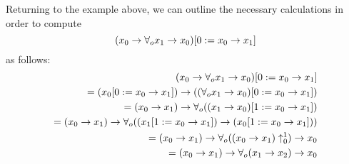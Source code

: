 Returning to the example above, we can outline the necessary calculations
in order to compute
$$\dbsub{0}{x_0\to x_1}{(x_0\to\forall_o x_1\to x_0)}$$
as follows:
\begin{eqnarray*}
\dbsub{0}{x_0\to x_1}{(x_0\to\forall_o x_1\to x_0)} \\
 = (\dbsub{0}{x_0\to x_1}{x_0})\to(\dbsub{0}{x_0\to x_1}{(\forall_o x_1\to x_0)}) \\
 = 
(x_0\to x_1)\to\forall_o (\dbsub{1}{x_0\to x_1}{(x_1\to x_0)}) \\
 = 
(x_0\to x_1)\to\forall_o ((\dbsub{1}{x_0\to x_1}{x_1}) \to (\dbsub{1}{x_0\to x_1}{x_0})) \\
 = 
(x_0\to x_1)\to\forall_o (\dbsh{0}{1}{(x_0\to x_1)}) \to x_0 \\
 = 
(x_0\to x_1)\to\forall_o (x_1\to x_2) \to x_0 \\
\end{eqnarray*}

